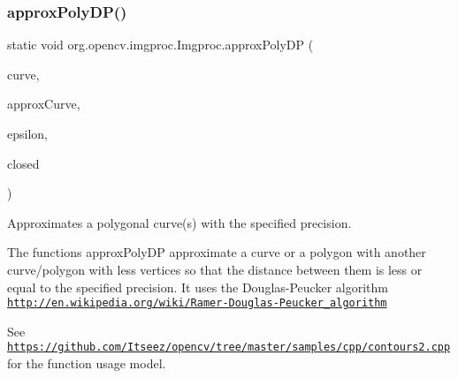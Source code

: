 \subsubsection{\texorpdfstring{approx\+Poly\+D\+P()}{approxPolyDP()}}
{\footnotesize\ttfamily static void org.\+opencv.\+imgproc.\+Imgproc.\+approx\+Poly\+DP (\begin{DoxyParamCaption}\item[{\mbox{\hyperlink{classorg_1_1opencv_1_1core_1_1_mat_of_point2f}{Mat\+Of\+Point2f}}}]{curve,  }\item[{\mbox{\hyperlink{classorg_1_1opencv_1_1core_1_1_mat_of_point2f}{Mat\+Of\+Point2f}}}]{approx\+Curve,  }\item[{double}]{epsilon,  }\item[{boolean}]{closed }\end{DoxyParamCaption})\hspace{0.3cm}{\ttfamily [static]}}

Approximates a polygonal curve(s) with the specified precision.

The functions {\ttfamily approx\+Poly\+DP} approximate a curve or a polygon with another curve/polygon with less vertices so that the distance between them is less or equal to the specified precision. It uses the Douglas-\/\+Peucker algorithm \href{http://en.wikipedia.org/wiki/Ramer-Douglas-Peucker_algorithm}{\tt http\+://en.\+wikipedia.\+org/wiki/\+Ramer-\/\+Douglas-\/\+Peucker\+\_\+algorithm}

See \href{https://github.com/Itseez/opencv/tree/master/samples/cpp/contours2.cpp}{\tt https\+://github.\+com/\+Itseez/opencv/tree/master/samples/cpp/contours2.\+cpp} for the function usage model.


